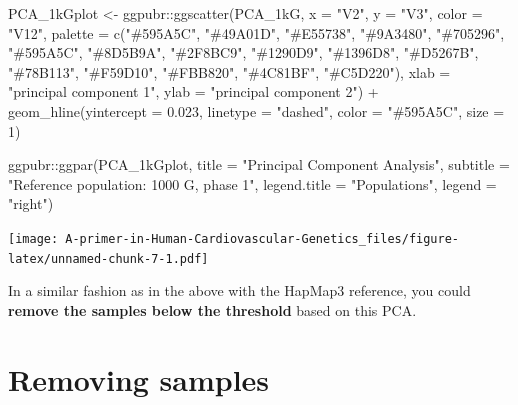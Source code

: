 \documentclass[
]{book}
\newenvironment{Shaded}{\begin{snugshade}}{\end{snugshade}}
\newcommand{\AttributeTok}[1]{\textcolor[rgb]{0.77,0.63,0.00}{#1}}
\newcommand{\DecValTok}[1]{\textcolor[rgb]{0.00,0.00,0.81}{#1}}
\newcommand{\FloatTok}[1]{\textcolor[rgb]{0.00,0.00,0.81}{#1}}
\newcommand{\FunctionTok}[1]{\textcolor[rgb]{0.00,0.00,0.00}{#1}}
\newcommand{\NormalTok}[1]{#1}
\newcommand{\OtherTok}[1]{\textcolor[rgb]{0.56,0.35,0.01}{#1}}
\newcommand{\SpecialCharTok}[1]{\textcolor[rgb]{0.00,0.00,0.00}{#1}}
\newcommand{\StringTok}[1]{\textcolor[rgb]{0.31,0.60,0.02}{#1}}
\begin{document}
\begin{Shaded}
\begin{Highlighting}[]
\NormalTok{PCA\_1kGplot }\OtherTok{\textless{}{-}}\NormalTok{ ggpubr}\SpecialCharTok{::}\FunctionTok{ggscatter}\NormalTok{(PCA\_1kG, }\AttributeTok{x =} \StringTok{"V2"}\NormalTok{, }\AttributeTok{y =} \StringTok{"V3"}\NormalTok{,}
                                 \AttributeTok{color =} \StringTok{"V12"}\NormalTok{,}
                                 \AttributeTok{palette =} \FunctionTok{c}\NormalTok{(}\StringTok{"\#595A5C"}\NormalTok{, }\StringTok{"\#49A01D"}\NormalTok{, }\StringTok{"\#E55738"}\NormalTok{, }\StringTok{"\#9A3480"}\NormalTok{, }\StringTok{"\#705296"}\NormalTok{, }
                                             \StringTok{"\#595A5C"}\NormalTok{, }\StringTok{"\#8D5B9A"}\NormalTok{, }\StringTok{"\#2F8BC9"}\NormalTok{, }\StringTok{"\#1290D9"}\NormalTok{, }\StringTok{"\#1396D8"}\NormalTok{, }
                                             \StringTok{"\#D5267B"}\NormalTok{, }\StringTok{"\#78B113"}\NormalTok{, }\StringTok{"\#F59D10"}\NormalTok{, }\StringTok{"\#FBB820"}\NormalTok{, }\StringTok{"\#4C81BF"}\NormalTok{, }\StringTok{"\#C5D220"}\NormalTok{),}
                                 \AttributeTok{xlab =} \StringTok{"principal component 1"}\NormalTok{, }\AttributeTok{ylab =} \StringTok{"principal component 2"}\NormalTok{) }\SpecialCharTok{+}
  \FunctionTok{geom\_hline}\NormalTok{(}\AttributeTok{yintercept =} \FloatTok{0.023}\NormalTok{, }\AttributeTok{linetype =} \StringTok{"dashed"}\NormalTok{,}
                \AttributeTok{color =} \StringTok{"\#595A5C"}\NormalTok{, }\AttributeTok{size =} \DecValTok{1}\NormalTok{)}

\NormalTok{  ggpubr}\SpecialCharTok{::}\FunctionTok{ggpar}\NormalTok{(PCA\_1kGplot,}
                \AttributeTok{title =} \StringTok{"Principal Component Analysis"}\NormalTok{,}
                \AttributeTok{subtitle =} \StringTok{"Reference population: 1000 G, phase 1"}\NormalTok{,}
                \AttributeTok{legend.title =} \StringTok{"Populations"}\NormalTok{, }\AttributeTok{legend =} \StringTok{"right"}\NormalTok{)}
\end{Highlighting}
\end{Shaded}

\texttt{[image: A-primer-in-Human-Cardiovascular-Genetics\_files/figure-latex/unnamed-chunk-7-1.pdf]}

In a similar fashion as in the above with the HapMap3 reference, you could \textbf{remove the samples below the threshold} based on this PCA.

\hypertarget{removing-samples}{%
\section{Removing samples}\label{removing-samples}}
\end{document}
